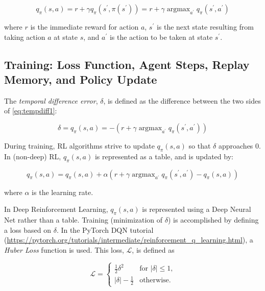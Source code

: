 \documentclass[acmlarge,screen]{acmart}
\DeclareMathOperator*{\argmax}{argmax}
\begin{document}
\begin{equation} \label{eq:tempdiff1}
  q_\pi (s,a) = r + \gamma q_\pi (s^\prime, \pi(s^\prime)) = r + \gamma \argmax_{a^\prime} q_\pi (s^\prime, a^\prime)
\end{equation}

\noindent where $r$ is the immediate reward for action $a$, $s^\prime$ is the next state resulting from taking
action $a$ at state $s$, and $a^\prime$ is the action to be taken at state $s^\prime$.



\subsection{Training: Loss Function, Agent Steps, Replay Memory, and Policy Update}


The \textit{temporal difference error}, $\delta$, is defined as the difference between the two sides of \ref{eq:tempdiff1}:

\begin{equation} \label{eq:tempdiff1}
 \delta =  q_\pi (s,a) = - \left( r + \gamma \argmax_{a^\prime} q_\pi (s^\prime, a^\prime) \right)
\end{equation}

During training, RL algorithms strive to update $q_\pi (s,a)$ so that $\delta$ approaches 0.
In (non-deep) RL, $q_\pi (s,a)$ is represented as a table, and is updated by:

\begin{equation} \label{eq:qupdate}
 q_\pi (s,a) = q_\pi (s,a) + \alpha \left( r + \gamma \argmax_{a^\prime} q_\pi (s^\prime, a^\prime) - q_\pi (s,a) \right)
\end{equation}

\noindent where $\alpha$ is the learning rate.

In Deep Reinforcement Learning, $q_\pi (s,a)$ is represented using a Deep Neural Net rather than a table.
Training (minimization of $\delta$) is accomplished by defining a loss based on $\delta$.
In the PyTorch DQN tutorial (\url{https://pytorch.org/tutorials/intermediate/reinforcement\_q\_learning.html}),
a \textit{Huber Loss} function is used.
This loss, $\mathcal{L}$, is defined as 


\begin{equation}  \label{eq:huberloss}
  \mathcal{L} =
    \begin{cases}
      \frac{1}{2} \delta^2 & \text{for $\lvert \delta \rvert \leq 1$,}\\
      \lvert \delta \rvert - \frac{1}{2} & \text{otherwise.}
    \end{cases}       
\end{equation}
\end{document}
